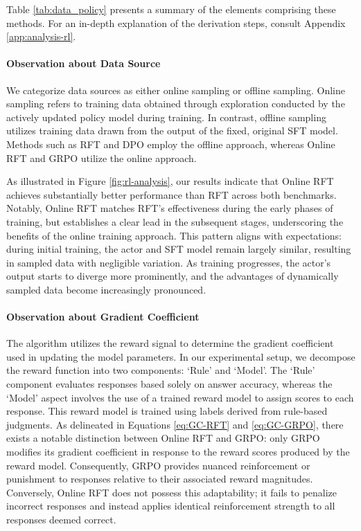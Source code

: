 \begin{itemize}[topsep=0pt]
\begin{itemize}[topsep=0pt]
Table \ref{tab:data_policy} presents a summary of the elements comprising these methods. For an in-depth explanation of the derivation steps, consult Appendix \ref{app:analysis-rl}.

\paragraph{Observation about Data Source} We categorize data sources as either online sampling or offline sampling. Online sampling refers to training data obtained through exploration conducted by the actively updated policy model during training. In contrast, offline sampling utilizes training data drawn from the output of the fixed, original SFT model. Methods such as RFT and DPO employ the offline approach, whereas Online RFT and GRPO utilize the online approach.

As illustrated in Figure \ref{fig:rl-analysis}, our results indicate that Online RFT achieves substantially better performance than RFT across both benchmarks. Notably, Online RFT matches RFT's effectiveness during the early phases of training, but establishes a clear lead in the subsequent stages, underscoring the benefits of the online training approach. This pattern aligns with expectations: during initial training, the actor and SFT model remain largely similar, resulting in sampled data with negligible variation. As training progresses, the actor's output starts to diverge more prominently, and the advantages of dynamically sampled data become increasingly pronounced.

\paragraph{Observation about Gradient Coefficient} The algorithm utilizes the reward signal to determine the gradient coefficient used in updating the model parameters. In our experimental setup, we decompose the reward function into two components: ‘Rule’ and ‘Model’. The ‘Rule’ component evaluates responses based solely on answer accuracy, whereas the ‘Model’ aspect involves the use of a trained reward model to assign scores to each response. This reward model is trained using labels derived from rule-based judgments. As delineated in Equations \ref{eq:GC-RFT} and \ref{eq:GC-GRPO}, there exists a notable distinction between Online RFT and GRPO: only GRPO modifies its gradient coefficient in response to the reward scores produced by the reward model. Consequently, GRPO provides nuanced reinforcement or punishment to responses relative to their associated reward magnitudes. Conversely, Online RFT does not possess this adaptability; it fails to penalize incorrect responses and instead applies identical reinforcement strength to all responses deemed correct.


\end{itemize}
\end{itemize}
